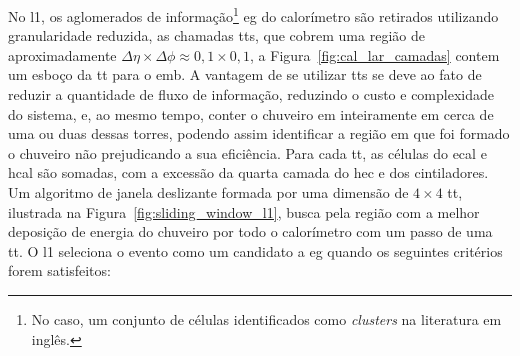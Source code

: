 No \gls{l1}, os aglomerados de informação\footnote{No caso, um conjunto de
células identificados como \emph{clusters} na literatura em inglês.} \gls{eg} do calorímetro são retirados
utilizando granularidade reduzida, as chamadas \glspl{tt}, que cobrem uma região
de aproximadamente $\Delta\eta\times\Delta\phi\approx0,1\times0,1$, 
a Figura~\ref{fig:cal_lar_camadas} contem um esboço da \gls{tt} para o
\gls{emb}. A vantagem de se utilizar \glspl{tt} se deve ao
fato de reduzir a quantidade de fluxo de informação, reduzindo o custo e
complexidade do sistema, e, ao mesmo tempo, conter o chuveiro \gls{em} inteiramente 
em cerca de uma ou duas dessas torres, podendo
assim identificar a região em que foi formado o chuveiro não prejudicando a sua
eficiência. Para cada \gls{tt}, as células do \gls{ecal} e \gls{hcal} são somadas, com a
excessão da quarta camada do \gls{hec} e dos cintiladores.
Um algoritmo de janela deslizante formada por uma dimensão de $4\times4$
\gls{tt}, ilustrada na Figura~\ref{fig:sliding_window_l1}, 
busca pela região com a melhor deposição de energia do chuveiro por
todo o calorímetro com um passo de uma \gls{tt}.
O \gls{l1} seleciona o evento como um candidato a \gls{eg} 
quando os seguintes critérios forem satisfeitos:

